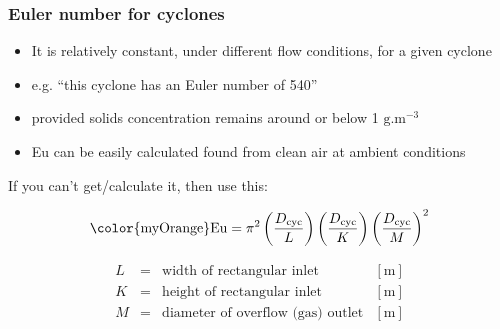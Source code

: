 \begin{frame}\frametitle{{\color{myOrange}Eu}ler number for cyclones}
	\begin{itemize}
		\item	It is relatively constant, under different flow conditions, for a given cyclone
		\item	e.g. ``this cyclone has an Euler number of 540''

		\item	provided solids concentration remains around or below 1 $\text{g.m}^{-3}$  %
		\item	{\color{myOrange}Eu} can be easily calculated found from clean air at ambient conditions 
	\end{itemize}
	
	\vspace{12pt}
	If you can't get/calculate it, then use this:
	\begin{exampleblock}{}
		\[\text{{\color{myOrange}Eu}} = \pi^2\left(\dfrac{D_\text{cyc}}{L}\right)\left(\dfrac{D_\text{cyc}}{K}\right)\left(\dfrac{D_\text{cyc}}{M}\right)^2\]
	\end{exampleblock}
	\[
		\begin{array}{rcll}
			L 			&=& \text{width of rectangular inlet} 				&[\text{m}]\\
			K 			&=& \text{height of rectangular inlet} 				&[\text{m}]\\
			M			&=& \text{diameter of overflow (gas) outlet}		& [\text{m}]
		\end{array}
	\]
\end{frame}

